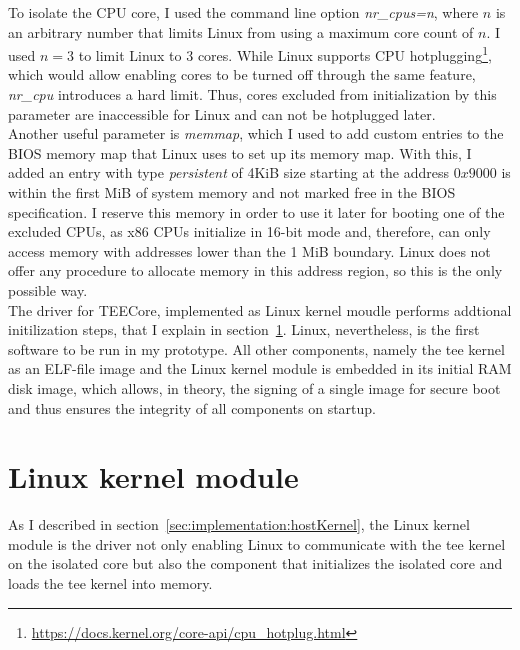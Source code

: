 To isolate the CPU core, I used the command line option \textit{nr\_cpus=n},
where $n$ is an arbitrary number that limits Linux from using a maximum core
count of $n$. I used $n=3$ to limit Linux to 3 cores. While Linux supports CPU
hotplugging\footnote{\url{https://docs.kernel.org/core-api/cpu_hotplug.html}},
which would allow enabling cores to be turned off through the same feature,
\textit{nr\_cpu} introduces a hard limit. Thus, cores excluded from
initialization by this parameter are inaccessible for Linux and can not be
hotplugged later. \\

Another useful parameter is \textit{memmap}, which I used to add custom entries
to the BIOS memory map that Linux uses to set up its memory map. With this, I
added an entry with type \textit{persistent} of 4KiB size starting at the
address $0x9000$ is within the first MiB of system memory and not marked free in
the BIOS specification. I reserve this memory in order to use it
later for booting one of the excluded CPUs, as x86 CPUs initialize in 16-bit
mode and, therefore, can only access memory with addresses lower than the 1 MiB
boundary. Linux does not offer any procedure to allocate memory in this address
region, so this is the only possible way. \\

The driver for TEECore, implemented as Linux kernel moudle performs addtional
initilization steps, that I explain in section~\ref{sec:implementation:kmod}.
Linux, nevertheless, is the first software to be run in my prototype. All other
components, namely the \gls{tee} kernel as an ELF-file image and the Linux
kernel module is embedded in its initial RAM disk image, which allows, in
theory, the signing of a single image for secure boot and thus ensures the
integrity of all components on startup.\\

\section{Linux kernel module}
\label{sec:implementation:kmod}
As I described in section~\ref{sec:implementation:hostKernel}, the Linux kernel
module is the driver not only enabling Linux to communicate with the \gls{tee}
kernel on the isolated core but also the component that initializes the isolated
core and loads the \gls{tee} kernel into memory.\\

